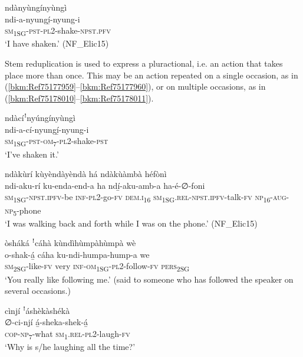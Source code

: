 \ea
\label{bkm:Ref99092338}
\glll ndànyùngínyùngì\\
ndi-a-nyungí̲-nyung-i\\
\textsc{sm}\textsubscript{1SG}-\textsc{pst}-\textsc{pl}2-shake-\textsc{npst}.\textsc{pfv}\\
\glt ‘I have shaken.’ (NF\_Elic15)
\z

Stem reduplication is used to express a pluractional, i.e. an action that takes place more than once. This may be an action repeated on a single occasion, as in (\ref{bkm:Ref75177959}--\ref{bkm:Ref75177960}), or on multiple occasions, as in (\ref{bkm:Ref75178010}--\ref{bkm:Ref75178011}).

\ea
\label{bkm:Ref75177959}
\glll ndàcíꜝnyúngínyùngì\\
ndi-a-cí-nyungí̲-nyung-i\\
\textsc{sm}\textsubscript{1SG}-\textsc{pst}-\textsc{om}\textsubscript{7}-\textsc{pl}2-shake-\textsc{pst} \\
\glt ‘I’ve shaken it.’
\z

\ea
\label{bkm:Ref75177960}
ndàkùrí kùyèndàyèndà há ndàkùàmbà héfònì\\
\gll ndi-aku-rí    ku-enda-end-a ha    ndí̲-aku-amb-a      ha-é-∅-foni\\
\textsc{sm}\textsubscript{1SG}-\textsc{npst}.\textsc{ipfv}-be  \textsc{inf}-\textsc{pl}2-go-\textsc{fv}
\textsc{dem}.\textsc{i}\textsubscript{16}  \textsc{sm}\textsubscript{1SG}.\textsc{rel}-\textsc{npst}.\textsc{ipfv}-talk-\textsc{fv}  \textsc{np}\textsubscript{16}-\textsc{aug}-\textsc{np}\textsubscript{5}-phone\\
\glt ‘I was walking back and forth while I was on the phone.’ (NF\_Elic15)
\z

\ea
\label{bkm:Ref75178010}
òsháká ꜝcáhà kùndìhùmpàhùmpà wè\\
\gll o-shak-á̲    cáha  ku-ndi-humpa-hump-a  we\\
\textsc{sm}\textsubscript{2SG}-like-\textsc{fv}  very  \textsc{inf}-\textsc{om}\textsubscript{1SG}-\textsc{pl}2-follow-\textsc{fv}  \textsc{pers}\textsubscript{2SG}\\
\glt ‘You really like following me.’ (said to someone who has followed the speaker on several occasions.)
\z

\ea
cìnjí ꜝáshèkàshékà\\
\gll ∅-ci-njí    á̲-sheka-shek-á̲\\
\textsc{cop}-\textsc{np}\textsubscript{7}-what  \textsc{sm}\textsubscript{1}.\textsc{rel}-\textsc{pl}2-laugh-\textsc{fv}\\
\glt ‘Why is s/he laughing all the time?’
\z

